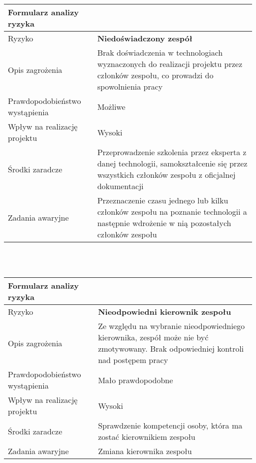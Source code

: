 \documentclass{article}
\begin{document}
{\def\arraystretch{1.3}\tabcolsep=10pt
\begin{tabular}{|L{6cm}|L{9cm}|}
\hline
Formularz analizy ryzyka &  \\
\hline
Ryzyko 						   & \textbf{Niedoświadczony zespół} \\
\hline
Opis zagrożenia				   & Brak doświadczenia w technologiach wyznaczonych do realizacji projektu przez członków zespołu, co prowadzi do spowolnienia pracy \\
\hline
Prawdopodobieństwo wystąpienia & Możliwe \\
\hline
Wpływ na realizację projektu   & Wysoki \\
\hline
Środki zaradcze				   & Przeprowadzenie szkolenia przez eksperta z danej technologii, samokształcenie się przez wszystkich członków zespołu z oficjalnej dokumentacji  \\
\hline
Zadania awaryjne			   & Przeznaczenie czasu jednego lub kilku członków zespołu na poznanie technologii a następnie wdrożenie w nią pozostałych członków zespołu \\
\hline
\end{tabular}}

\mbox{}\\\mbox{}\\

{\def\arraystretch{1.3}\tabcolsep=10pt
\begin{tabular}{|L{6cm}|L{9cm}|}
\hline
Formularz analizy ryzyka &  \\
\hline
Ryzyko 						   & \textbf{Nieodpowiedni kierownik zespołu} \\
\hline
Opis zagrożenia				   & Ze względu na wybranie nieodpowiedniego kierownika, zespół może nie być zmotywowany. Brak odpowiedniej kontroli nad postępem pracy \\
\hline
Prawdopodobieństwo wystąpienia & Mało prawdopodobne \\
\hline
Wpływ na realizację projektu   & Wysoki \\
\hline
Środki zaradcze				   & Sprawdzenie kompetencji osoby, która ma zostać kierownikiem zespołu \\
\hline
Zadania awaryjne			   & Zmiana kierownika zespołu \\
\hline
\end{tabular}}

\mbox{}\\\mbox{}\\
\end{document}
